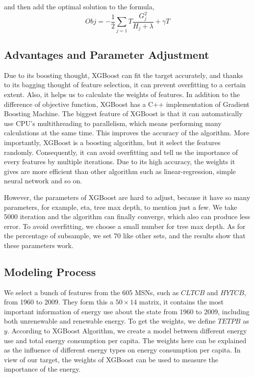 \documentclass{mcmthesis}
\begin{document}
and then add the optimal solution to the formula,
\begin{equation}
Obj = -\frac{1}{2}\sum_{j=1}{T}\frac{G_j^2}{H_j + \lambda} + \gamma T
\end{equation}

\subsection{Advantages and Parameter Adjustment}
Due to its boosting thought, XGBoost can fit the target accurately, and thanks to its bagging thought of feature selection, it can prevent overfitting to a certain extent. Also, it helps us to calculate the weights of features.
In addition to the difference of objective function, XGBoost has a C++ implementation of Gradient Boosting Machine.
The biggest feature of XGBoost is that it can automatically use CPU's multithreading to parallelism, which means performing many calculations at the same time. This improves the accuracy of the algorithm.
More importantly, XGBoost is a boosting algorithm, but it select the features randomly.
Consequently, it can avoid overfitting and tell us the importance of every features by multiple iterations.
Due to its high accuracy, the weights it gives are more efficient than other algorithm such as linear-regression, simple neural network and so on.

However, the parameters of XGBoost are hard to adjust, because it have so many parameters, for example, eta, tree max depth, to mention just a few.
We take 5000 iteration and the algorithm can finally converge, which also can produce less error.
To avoid overfitting, we choose a small number for tree max depth.
As for the percentage of subsample, we set 70 like other sets, and the results show that these parameters work.

\subsection{Modeling Process}
We select a bunch of features from the 605 MSNs, such as $CLTCB$ and $HYTCB$, from 1960 to 2009.
They form this a $50 \times 14$ matrix, it contains the most important information of energy use about the state from 1960 to 2009, including both unrenewable and renewable energy.
To get the weights, we define $TETPB$ as $y$.
According to XGBoost Algorithm, we create a model between different energy use and total energy consumption per capita.
The weights here can be explained as the influence of different energy types on energy consumption per capita.
In view of our target, the weights of XGBoost can be used to measure the importance of the energy.
\end{document}
